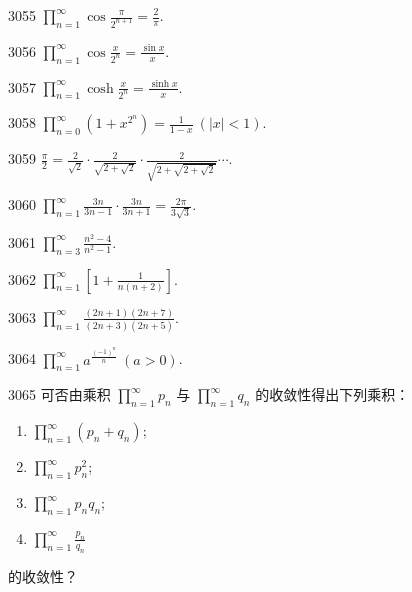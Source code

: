 \begin{prob}[S]{3055}
$\displaystyle \prod_{n=1}^{\infty} \cos \frac{\pi}{2^{n+1}} = \frac{2}{\pi}$.
\end{prob}

\begin{prob}[S]{3056}
$\displaystyle \prod_{n=1}^{\infty} \cos \frac{x}{2^{n}} = \frac{\sin x}{x}$.
\end{prob}

\begin{prob}[S]{3057}
$\displaystyle \prod_{n=1}^{\infty} \cosh \frac{x}{2^{n}} = \frac{\sinh x}{x}$.
\end{prob}

\begin{prob}[S]{3058}
$\displaystyle \prod_{n=0}^{\infty} \left(1 + x^{2^{n}}\right) = \frac{1}{1-x} \ (|x| < 1)$.
\end{prob}

\begin{prob}[S]{3059}
$\displaystyle \frac{\pi}{2} = \frac{2}{\sqrt{2}} \cdot \frac{2}{\sqrt{2+\sqrt{2}}} \cdot \frac{2}{\sqrt{2+\sqrt{2+\sqrt{2}}}} \cdots$.
\end{prob}

\begin{prob}[S]{3060}
$\displaystyle \prod_{n=1}^{\infty} \frac{3n}{3n-1} \cdot \frac{3n}{3n+1} = \frac{2\pi}{3\sqrt{3}}$.
\end{prob}


\begin{prob}[S]{3061}
$\displaystyle \prod_{n=3}^{\infty} \frac{n^{2}-4}{n^{2}-1}$.
\end{prob}

\begin{prob}[S]{3062}
$\displaystyle \prod_{n=1}^{\infty} \left[1 + \frac{1}{n(n+2)}\right]$.
\end{prob}

\begin{prob}[S]{3063}
$\displaystyle \prod_{n=1}^{\infty} \frac{(2n+1)(2n+7)}{(2n+3)(2n+5)}$.
\end{prob}

\begin{prob}[S]{3064}
$\displaystyle \prod_{n=1}^{\infty} a^{\frac{(-1)^{n}}{n}} \ (a > 0)$.
\end{prob}

\begin{prob}[L]{3065}
可否由乘积 $\displaystyle \prod_{n=1}^{\infty} p_{n}$ 与 $\displaystyle \prod_{n=1}^{\infty} q_{n}$ 的收敛性得出下列乘积：
\begin{enumerate}[label=(\alph*), itemsep=2pt, topsep=3pt]
\item $\displaystyle \prod_{n=1}^{\infty} (p_{n} + q_{n})$;
\item $\displaystyle \prod_{n=1}^{\infty} p_{n}^{2}$;
\item $\displaystyle \prod_{n=1}^{\infty} p_{n} q_{n}$;
\item $\displaystyle \prod_{n=1}^{\infty} \frac{p_{n}}{q_{n}}$
\end{enumerate}
的收敛性？
\end{prob}

